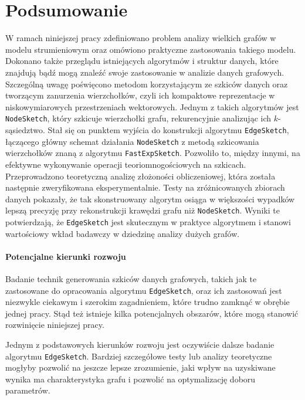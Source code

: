 \chapter*{Podsumowanie}
\label{chap:summary}

    W ramach niniejszej pracy zdefiniowano problem analizy wielkich grafów w modelu strumieniowym oraz omówiono praktyczne zastosowania takiego modelu. Dokonano także przeglądu istniejących algorytmów i struktur danych, które znajdują bądź mogą znaleźć swoje zastosowanie w analizie danych grafowych. Szczególną uwagę poświęcono metodom korzystającym ze szkiców danych oraz tworzącym zanurzenia wierzchołków, czyli ich kompaktowe reprezentacje w niskowymiarowych przestrzeniach wektorowych. Jednym z takich algorytmów jest \texttt{NodeSketch}, który szkicuje wierzchołki grafu, rekurencyjnie analizując ich $k$-sąsiedztwo. Stał się on punktem wyjścia do konstrukcji algorytmu \texttt{EdgeSketch}, łączącego główny schemat działania \texttt{NodeSketch} z metodą szkicowania wierzchołków znaną z algorytmu \texttt{FastExpSketch}. Pozwoliło to, między innymi, na efektywne wykonywanie operacji teoriomnogościowych na szkicach. Przeprowadzono teoretyczną analizę złożoności obliczeniowej, która została następnie zweryfikowana eksperymentalnie. Testy na zróżnicowanych zbiorach danych pokazały, że tak skonstruowany algorytm osiąga w większości wypadków lepszą precyzję przy rekonstrukcji krawędzi grafu niż \texttt{NodeSketch}. Wyniki te potwierdzają, że \texttt{EdgeSketch} jest skutecznym w praktyce algorytmem i stanowi wartościowy wkład badawczy w dziedzinę analizy dużych grafów.

\subsubsection*{Potencjalne kierunki rozwoju}
    Badanie technik generowania szkiców danych grafowych, takich jak te zastosowane do opracowania algorytmu \texttt{EdgeSketch}, oraz ich zastosowań jest niezwykle ciekawym i szerokim zagadnieniem, które trudno zamknąć w obrębie jednej pracy. Stąd też istnieje kilka potencjalnych obszarów, które mogą stanowić rozwinięcie niniejszej pracy. 
    
    Jednym z podstawowych kierunków rozwoju jest oczywiście dalsze badanie algorytmu \texttt{EdgeSketch}. Bardziej szczegółowe testy lub analizy teoretyczne mogłyby pozwolić na jeszcze lepsze zrozumienie, jaki wpływ na uzyskiwane wynika ma charakterystyka grafu i pozwolić na optymalizację doboru parametrów.

